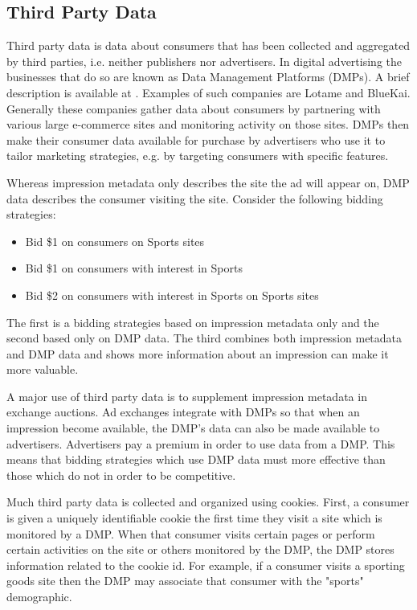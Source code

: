 \documentclass{article}
\begin{document}
\subsection{Third Party Data}

Third party data is data about consumers that has been collected and aggregated by third parties, i.e. neither publishers nor advertisers. In digital advertising the businesses that do so are known as Data Management Platforms (DMPs). A brief description is available at \cite{iab1}. Examples of such companies are Lotame and  BlueKai. Generally these companies gather data about consumers by partnering with various large e-commerce sites and monitoring activity on those sites. DMPs then make their consumer data available for purchase by advertisers who use it to tailor marketing strategies, e.g. by targeting consumers with specific features.

Whereas impression metadata only describes the site the ad will appear on, DMP data describes the consumer visiting the site. Consider the following bidding strategies:

\begin{itemize}
\item Bid \$1 on consumers on Sports sites
\item Bid \$1 on consumers with interest in Sports
\item Bid \$2 on consumers with interest in Sports on Sports sites
\end{itemize}

The first is a bidding strategies based on impression metadata only and the second based only on DMP data. The third combines both impression metadata and DMP data and shows more information about an impression can make it more valuable.

A major use of third party data is to supplement impression metadata in exchange auctions. Ad exchanges integrate with DMPs so that when an impression become available, the DMP's data can also be made available to advertisers. Advertisers pay a premium in order to use data from a DMP. This means that bidding strategies which use DMP data must more effective than those which do not in order to be competitive.

Much third party data is collected and organized using cookies. First, a consumer is given a uniquely identifiable cookie the first time they visit a site which is monitored by a DMP. When that consumer visits certain pages or perform certain activities on the site or others monitored by the DMP, the DMP stores information related to the cookie id. For example, if a consumer visits a sporting goods site then the DMP may associate that consumer with the "sports" demographic.
\end{document}
